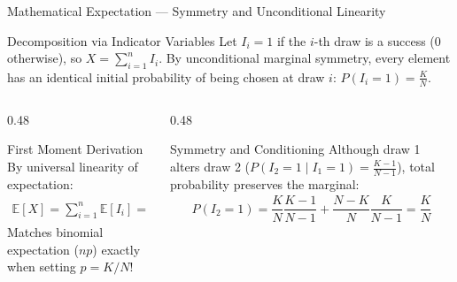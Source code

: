 \documentclass[aspectratio=169,xcolor={dvipsnames,table}]{beamer}
\begin{document}
\begin{frame}{Mathematical Expectation --- Symmetry and Unconditional Linearity}
	\vspace{-0.15cm}
	\begin{block}{Decomposition via Indicator Variables}
		\footnotesize
		Let $I_i = 1$ if the $i$-th draw is a success ($0$ otherwise), so $X = \sum_{i=1}^n I_i$. By unconditional marginal symmetry, every element has an identical initial probability of being chosen at draw $i$: $P(I_i = 1) = \frac{K}{N}$.
	\end{block}
	\vspace{-0.2cm}
	\begin{columns}[T]
		\begin{column}{0.48\textwidth}
			\begin{exampleblock}{First Moment Derivation}
				\scriptsize
				By universal linearity of expectation:
				\begin{align*}
					\mathbb{E}[X] = \sum_{i=1}^n \mathbb{E}[I_i] = \sum_{i=1}^n \dfrac{K}{N} = n \dfrac{K}{N}
				\end{align*}
				Matches binomial expectation ($np$) exactly when setting $p = K/N$!
			\end{exampleblock}
		\end{column}
		\begin{column}{0.48\textwidth}
			\begin{alertblock}{Symmetry and Conditioning}
				\scriptsize
				Although draw 1 alters draw 2 ($P(I_2=1 \mid I_1=1) = \frac{K-1}{N-1}$), total probability preserves the marginal:
				\begin{align*}
					P(I_2=1) = \dfrac{K}{N}\dfrac{K-1}{N-1} + \dfrac{N-K}{N}\dfrac{K}{N-1} = \dfrac{K}{N}
				\end{align*}
			\end{alertblock}
		\end{column}
	\end{columns}
\end{frame}
\end{document}

